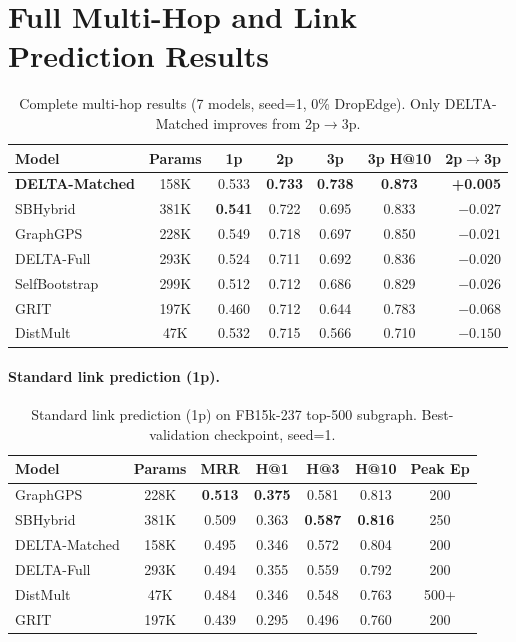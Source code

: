 \documentclass{article}
\begin{document}
\section{Full Multi-Hop and Link Prediction Results}
\label{app:multihop_full}

\begin{table}[h]
\centering
\caption{Complete multi-hop results (7 models, seed=1, 0\% DropEdge). Only DELTA-Matched improves from 2p$\to$3p.}
\label{tab:all_models}
\begin{tabular}{@{}lcccccr@{}}
\toprule
\textbf{Model} & \textbf{Params} & \textbf{1p} & \textbf{2p} & \textbf{3p} & \textbf{3p H@10} & \textbf{2p$\to$3p} \\
\midrule
\textbf{DELTA-Matched} & 158K & 0.533 & \textbf{0.733} & \textbf{0.738} & \textbf{0.873} & \textbf{+0.005} \\
SBHybrid & 381K & \textbf{0.541} & 0.722 & 0.695 & 0.833 & $-0.027$ \\
GraphGPS & 228K & 0.549 & 0.718 & 0.697 & 0.850 & $-0.021$ \\
DELTA-Full & 293K & 0.524 & 0.711 & 0.692 & 0.836 & $-0.020$ \\
SelfBootstrap & 299K & 0.512 & 0.712 & 0.686 & 0.829 & $-0.026$ \\
GRIT & 197K & 0.460 & 0.712 & 0.644 & 0.783 & $-0.068$ \\
DistMult & 47K & 0.532 & 0.715 & 0.566 & 0.710 & $-0.150$ \\
\bottomrule
\end{tabular}
\end{table}

\paragraph{Standard link prediction (1p).}
\label{app:lp_full}

\begin{table}[h]
\centering
\caption{Standard link prediction (1p) on FB15k-237 top-500 subgraph. Best-validation checkpoint, seed=1.}
\label{tab:lp}
\begin{tabular}{@{}lcccccc@{}}
\toprule
\textbf{Model} & \textbf{Params} & \textbf{MRR} & \textbf{H@1} & \textbf{H@3} & \textbf{H@10} & \textbf{Peak Ep} \\
\midrule
GraphGPS & 228K & \textbf{0.513} & \textbf{0.375} & 0.581 & 0.813 & 200 \\
SBHybrid & 381K & 0.509 & 0.363 & \textbf{0.587} & \textbf{0.816} & 250 \\
DELTA-Matched & 158K & 0.495 & 0.346 & 0.572 & 0.804 & 200 \\
DELTA-Full & 293K & 0.494 & 0.355 & 0.559 & 0.792 & 200 \\
DistMult & 47K & 0.484 & 0.346 & 0.548 & 0.763 & 500+ \\
GRIT & 197K & 0.439 & 0.295 & 0.496 & 0.760 & 200 \\
\bottomrule
\end{tabular}
\end{table}
\end{document}
